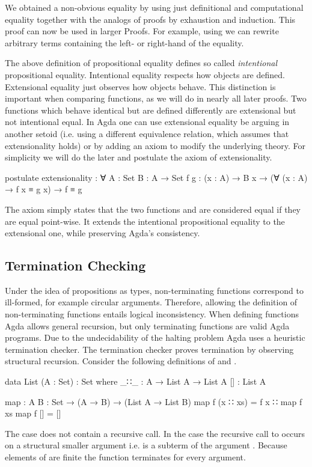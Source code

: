 We obtained a non-obvious equality by using just definitional and computational
equality together with the analogs of proofs by exhaustion and induction.
This proof can now be used in larger Proofs.
For example, using  we can rewrite arbitrary terms containing
the left- or right-hand of the equality.

The above definition of propositional equality defines so called
\textit{intentional} propositional equality.
Intentional equality respects how objects are defined.
Extensional equality just observes how objects behave.
This distinction is important when comparing functions, as we will do in nearly
all later proofs.
Two functions which behave identical but are defined differently are
extensional but not intentional equal.
In Agda one can use extensional equality be arguing in another setoid (i.e.
using a different equivalence relation, which assumes that extensionality holds)
or by adding an axiom to modify the underlying theory.
For simplicity we will do the later and postulate the axiom of extensionality.

\begin{code}
postulate
  extensionality : ∀ {A : Set} {B : A → Set} 
    {f g : (x : A) → B x} → (∀ (x : A) → f x ≡ g x) → f ≡ g
\end{code}
The axiom simply states that the two functions  and
 are considered equal if they are equal point-wise.
It extends the intentional propositional equality to the extensional one, while
preserving Agda's consistency.


\subsection{Termination Checking}
\label{sec:termination-checking}

Under the idea of propositions as types, non-terminating functions correspond to
ill-formed, for example circular arguments. %
Therefore, allowing the definition of non-terminating functions entails logical
inconsistency.
When defining functions Agda allows general recursion, but only terminating
functions are valid Agda programs.
Due to the undecidability of the halting problem Agda uses a heuristic
termination checker.
The termination checker proves termination by observing structural recursion.
Consider the following definitions of  and
.

\begin{code}
data List (A : Set) : Set where
  _∷_  : A → List A → List A
  []   : List A

map : {A B : Set} → (A → B) → (List A → List B)
map f (x ∷ xs)  = f x ∷ map f xs
map f []        = []
\end{code}
The \AgdaInductiveConstructor{[]} case does not contain a recursive call.
In the  case the recursive call to
 occurs on a structural smaller argument i.e.
 is a subterm of the argument
\;\;.
Because elements of  are finite the function
 terminates for every argument.


